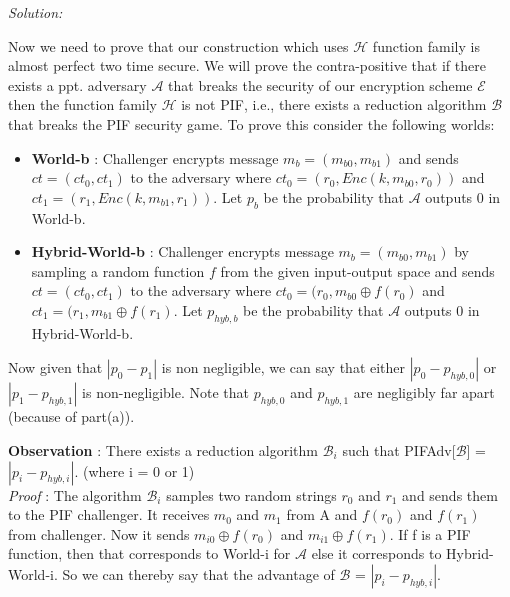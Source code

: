 \documentclass[a4paper, 11pt]{article}
\newenvironment{solution}
    {\textit{Solution:}}
    {\clearpage}
\newcommand{\calA}{\mathcal{A}}
\newcommand{\calB}{\mathcal{B}}
\newcommand{\calE}{\mathcal{E}}
\newcommand{\calH}{\mathcal{H}}
\begin{document}
\begin{solution}
\begin{enumerate}[(a)]
        Now we need to prove that our construction which uses $\calH$ function family is almost perfect two time secure. We will prove the contra-positive that if there exists a ppt. adversary $\calA$ that breaks the security of our encryption scheme $\calE$ then the function family $\calH$ is not PIF, i.e., there exists a reduction algorithm $\calB$ that breaks the PIF security game. To prove this consider the following worlds: 
        \begin{itemize}
            \item \textbf{World-b} : Challenger encrypts message $m_b = (m_{b0}, m_{b1})$ and sends $ct = (ct_0, ct_1)$ to the adversary where $ct_0 = (r_0, Enc(k, m_{b0}, r_0))$ and $ct_1 = (r_1, Enc(k, m_{b1}, r_1))$. Let $p_b$ be the probability that $\calA$ outputs 0 in World-b.
            \item \textbf{Hybrid-World-b} : Challenger encrypts message  $m_b = (m_{b0}, m_{b1})$ by sampling a random function $f$ from the given input-output space and sends $ct = (ct_0, ct_1)$ to the adversary where $ct_0 = (r_0, m_{b0} \oplus f(r_0)$ and $ct_1 = (r_1, m_{b1} \oplus f(r_1)$. Let $p_{hyb,b}$ be the probability that $\calA$ outputs 0 in Hybrid-World-b.
        \end{itemize}

        Now given that $|p_0 - p_1|$ is non negligible, we can say that either $|p_0 - p_{hyb,0}|$ or $|p_1 - p_{hyb,1}|$ is non-negligible. Note that $p_{hyb,0}$ and $ p_{hyb,1}$ are negligibly far apart (because of part(a)).

        \textbf{Observation} : There exists a reduction algorithm $\calB_i$ such that PIFAdv[$\calB$] = $|p_i - p_{hyb,i}|$. (where i = 0 or 1) \\
        \textit{Proof} : The algorithm $\calB_i$ samples two random strings $r_0$ and $r_1$ and sends them to the PIF challenger. It receives $m_0$ and $m_1$ from A and $f(r_0)$ and $f(r_1)$ from challenger. Now it sends $m_{i0} \oplus f(r_0)$ and $m_{i1} \oplus f(r_1)$. If f is a PIF function, then that corresponds to World-i for $\calA$ else it corresponds to Hybrid-World-i. So we can thereby say that the advantage of $\calB$ = $|p_i - p_{hyb,i}|$.
        
    \end{enumerate}
\end{solution}
\end{document}
